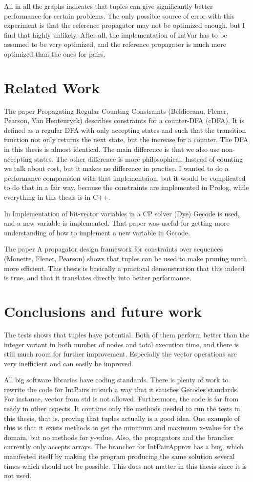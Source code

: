 \documentclass[a4paper,11pt]{article}
\begin{document}
All in all the graphs indicates that tuples can give significantly better performance for certain problems. The only possible source of error with this experiment is that the reference propagator may not be optimized enough, but I find that highly unlikely. After all, the implementation of IntVar has to be assumed to be very optimized, and the reference propagator is much more optimized than the ones for pairs.

\section{Related Work}
The paper Propagating Regular Counting Constraints (Beldiceanu, Flener, Pearson, Van Hentenryck) describes constraints for a counter-DFA (cDFA). It is defined as a regular DFA with only accepting states and such that the transition function not only returns the next state, but the increase for a counter. The DFA in this thesis is almost identical. The main difference is that we also use non-accepting states. The other difference is more philosophical. Instead of counting we talk about cost, but it makes no difference in practise. I wanted to do a performance comparasion with that implementaion, but it would be complicated to do that in a fair way, because the constraints are implemented in Prolog, while everything in this thesis is in C++.

In Implementation of bit-vector variables in a CP solver (Dye) Gecode is used, and a new variable is implemented. That paper was useful for getting more understanding of how to implement a new variable in Gecode.

The paper A propagator design framework for constraints over sequences (Monette, Flener, Pearson) shows that tuples can be used to make pruning much more efficient. This thesis is basically a practical demonstration that this indeed is true, and that it translates directly into better performance.

\section{Conclusions and future work}
The tests shows that tuples have potential. Both of them perform better than the integer variant in both number of nodes and total execution time, and there is still much room for further improvement. Especially the vector operations are very inefficient and can easily be improved.

All big software libraries have coding standards. There is plenty of work to rewrite the code for IntPairs in such a way that it satisfies Gecodes standards. For instance, vector from std is not allowed. Furthermore, the code is far from ready in other aspects. It contains only the methods needed to run the tests in this thesis, that is, proving that tuples actually is a good idea. One example of this is that it exists methods to get the minimum and maximum x-value for the domain, but no methods for y-value. Also, the propagators and the brancher currently only accepts arrays. The brancher for IntPairApprox has a bug, which manifested itself by making the program producing the same solution several times which should not be possible. This does not matter in this thesis since it is not used.
\end{document}
